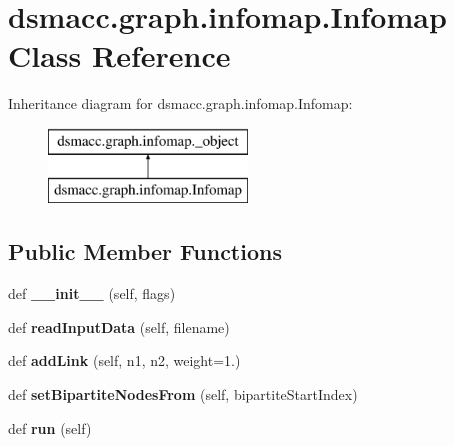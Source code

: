 \hypertarget{classdsmacc_1_1graph_1_1infomap_1_1Infomap}{}\section{dsmacc.\+graph.\+infomap.\+Infomap Class Reference}
\label{classdsmacc_1_1graph_1_1infomap_1_1Infomap}
Inheritance diagram for dsmacc.\+graph.\+infomap.\+Infomap\+:\begin{figure}[H]
\begin{center}
\leavevmode
\includegraphics[height=2.000000cm]{classdsmacc_1_1graph_1_1infomap_1_1Infomap}
\end{center}
\end{figure}
\subsection*{Public Member Functions}
\begin{DoxyCompactItemize}
\item 
\mbox{\label{classdsmacc_1_1graph_1_1infomap_1_1Infomap_a72523619d50f702a63e745a400aec742}} 
def {\bfseries \+\_\+\+\_\+init\+\_\+\+\_\+} (self, flags)
\item 
\mbox{\label{classdsmacc_1_1graph_1_1infomap_1_1Infomap_a4698e9b75893e922a52edf35c3ac1a7b}} 
def {\bfseries read\+Input\+Data} (self, filename)
\item 
\mbox{\label{classdsmacc_1_1graph_1_1infomap_1_1Infomap_a72f21ae26110fb3aaa859e131a8014f7}} 
def {\bfseries add\+Link} (self, n1, n2, weight=1.)
\item 
\mbox{\label{classdsmacc_1_1graph_1_1infomap_1_1Infomap_a457811aceb9ed782809cc9e3ddc91430}} 
def {\bfseries set\+Bipartite\+Nodes\+From} (self, bipartite\+Start\+Index)
\item 
\mbox{\label{classdsmacc_1_1graph_1_1infomap_1_1Infomap_aee11899c92c00ae403ea29162282b7b7}} 
def {\bfseries run} (self)
\end{DoxyCompactItemize}
